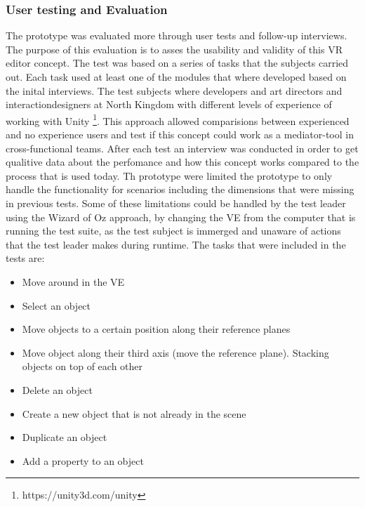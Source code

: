 \subsubsection{User testing and Evaluation}
The prototype was evaluated more through user tests and follow-up interviews. The purpose of this evaluation is to asses the usability and validity of this VR editor concept. The test was based on a series of tasks that the subjects carried out. Each task used at least one of the modules that where developed based on the inital interviews.
The test subjects where developers and art directors and interactiondesigners at North Kingdom with different levels of experience of working with Unity \footnote{https://unity3d.com/unity}. This approach allowed comparisions between experienced and no experience users and test if this concept could work as a mediator-tool in cross-functional teams. After each test an interview was conducted in order to get qualitive data about the perfomance and how this concept works compared to the process that is used today. Th prototype were limited the prototype to only handle the functionality for scenarios including the dimensions that were missing in previous tests. Some of these limitations could be handled by the test leader using the Wizard of Oz approach\cite{proto:landauer1987psychology}, by changing the VE from the computer that is running the test suite, as the test subject is immerged and unaware of actions that the test leader makes during runtime.
The tasks that were included in the tests are:
\begin{itemize}
  \item Move around in the VE
  \item Select an object
  \item Move objects to a certain position along their reference planes
  \item Move object along their third axis (move the reference plane). Stacking objects on top of each other
  \item Delete an object
  \item Create a new object that is not already in the scene
  \item Duplicate an object
  \item Add a property to an object
\end{itemize}
